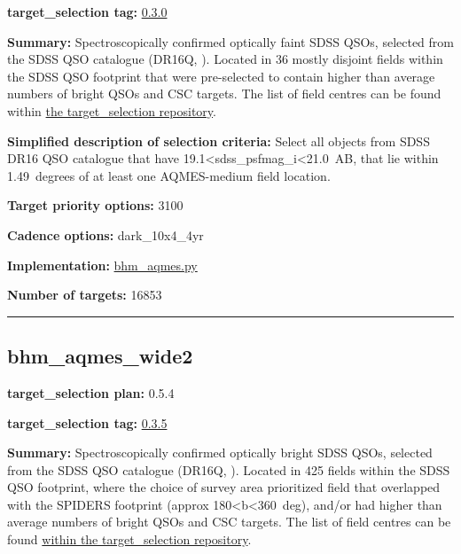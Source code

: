 \noindent\textbf{target\_selection tag:}
\href{https://github.com/sdss/target_selection/tree/0.3.0/}{0.3.0}

\noindent\textbf{Summary:} Spectroscopically confirmed optically faint SDSS QSOs,
selected from the SDSS QSO catalogue (DR16Q,
\citealt{Lyke2020}). Located in 36 mostly disjoint fields within the SDSS QSO
footprint that were pre-selected to contain higher than average numbers
of bright QSOs and CSC targets. The list of field centres can be found
within
\href{https://github.com/sdss/target_selection/blob/0.3.0/python/target_selection/masks/candidate_target_fields_bhm_aqmes_med_v0.3.1.fits}{the
target\_selection repository}.

\noindent\textbf{Simplified description of selection criteria:} Select all
objects from SDSS DR16 QSO catalogue that have
19.1\textless{}sdss\_psfmag\_i\textless{}21.0~AB, that lie within
1.49~degrees of at least one AQMES-medium field location.


\noindent\textbf{Target priority options:} 3100

\noindent\textbf{Cadence options:} dark\_10x4\_4yr

\noindent\textbf{Implementation:}
\href{https://github.com/sdss/target_selection/blob/0.3.0/python/target_selection/cartons/bhm_aqmes.py}{bhm\_aqmes.py}

\noindent\textbf{Number of targets:} 16853

\begin{center}\rule{0.5\linewidth}{0.5pt}\end{center}

\hypertarget{bhm_aqmes_wide2_plan0.5.4}{%
\subsection{bhm\_aqmes\_wide2}\label{bhm_aqmes_wide2_plan0.5.4}}

\noindent\textbf{target\_selection plan:} 0.5.4

\noindent\textbf{target\_selection tag:}
\href{https://github.com/sdss/target_selection/tree/0.3.5/}{0.3.5}

\noindent\textbf{Summary:} Spectroscopically confirmed optically bright SDSS
QSOs, selected from the SDSS QSO catalogue (DR16Q,
\citealt{Lyke2020}). Located in 425 fields within the SDSS QSO footprint,
where the choice of survey area prioritized field that overlapped with
the SPIDERS footprint (approx 180\textless{}b\textless{}360~deg), and/or
had higher than average numbers of bright QSOs and CSC targets. The list
of field centres can be found
\href{https://github.com/sdss/target_selection/blob/0.3.0/python/target_selection/masks/candidate_target_fields_bhm_aqmes_wide_v0.3.1.fits}{within
the target\_selection repository}.


